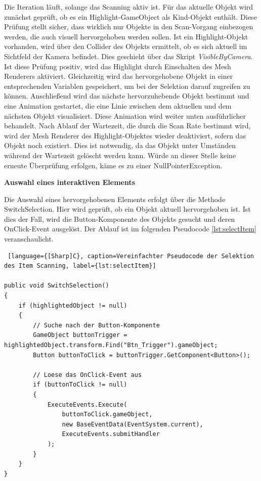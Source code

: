 Die Iteration läuft, solange das Scanning aktiv ist. Für das aktuelle Objekt wird zunächst geprüft, ob es ein Highlight-GameObject als Kind-Objekt enthält. Diese Prüfung stellt sicher, dass wirklich nur Objekte in den Scan-Vorgang einbezogen werden, die auch visuell hervorgehoben werden sollen. Ist ein Highlight-Objekt vorhanden, wird über den Collider des Objekts ermittelt, ob es sich aktuell im Sichtfeld der Kamera befindet. Dies geschieht über das Skript \textit{VisibleByCamera}.
Ist diese Prüfung positiv, wird das Highlight durch Einschalten des Mesh Renderers aktiviert. Gleichzeitig wird das hervorgehobene Objekt in einer entsprechenden Variablen gespeichert, um bei der Selektion darauf zugreifen zu können. Anschließend wird das nächste hervorzuhebende Objekt bestimmt und eine Animation gestartet, die eine Linie zwischen dem aktuellen und dem nächsten Objekt visualisiert. Diese Animation wird weiter unten ausführlicher behandelt. Nach Ablauf der Wartezeit, die durch die Scan Rate bestimmt wird, wird der Mesh Renderer des Highlight-Objektes wieder deaktiviert, sofern das Objekt noch existiert. Dies ist notwendig, da das Objekt unter Umständen während der Wartezeit gelöscht werden kann. Würde an dieser Stelle keine erneute Überprüfung erfolgen, käme es zu einer NullPointerException.


\textbf{Auswahl eines interaktiven Elements}

Die Auswahl eines hervorgehobenen Elements erfolgt über die Methode SwitchSelection. Hier wird geprüft, ob ein Objekt aktuell hervorgehoben ist. Ist dies der Fall, wird die Button-Komponente des Objekts gesucht und deren OnClick-Event ausgelöst. Der Ablauf ist im folgenden Pseudocode \autoref{lst:selectItem} veranschaulicht.

\begin{lstlisting} [language={[Sharp]C}, caption=Vereinfachter Pseudocode der Selektion des Item Scanning, label={lst:selectItem}]

public void SwitchSelection()
{
    if (highlightedObject != null)
    {
        // Suche nach der Button-Komponente
        GameObject buttonTrigger = highlightedObject.transform.Find("Btn_Trigger").gameObject;
        Button buttonToClick = buttonTrigger.GetComponent<Button>();

        // Loese das OnClick-Event aus
        if (buttonToClick != null)
        {
            ExecuteEvents.Execute(
                buttonToClick.gameObject,
                new BaseEventData(EventSystem.current),
                ExecuteEvents.submitHandler
            );
        }
    }
}
    
\end{lstlisting}

